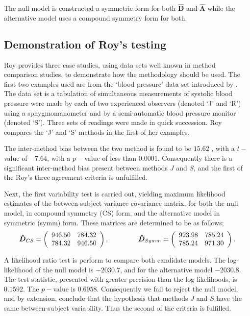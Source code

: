 The null model is constructed a symmetric form for both $\boldsymbol{\hat{D}}$ and $\boldsymbol{\hat{\Lambda}}$ while the alternative model uses a compound symmetry form for both.

\subsection{Demonstration of Roy's testing}
Roy provides three case studies, using data sets well known in method comparison studies, to demonstrate how the methodology should be used. The first two examples used are from the `blood pressure' data set introduced by \citet{BA99}. The data set is a tabulation of simultaneous measurements of systolic blood pressure were made by each of two experienced observers (denoted `J' and `R') using a sphygmomanometer and by a semi-automatic blood pressure monitor (denoted `S'). Three sets of readings were made in quick succession. Roy compares the `J' and `S' methods in the first of her examples.

The inter-method bias between the two method is found to be $15.62$ , with a $t-$value of $-7.64$, with a $p-$value of less than $0.0001$. Consequently there is a significant inter-method bias present between methods $J$ and $S$, and the first of the Roy's three agreement criteria is unfulfilled.

Next, the first variability test is carried out, yielding maximum likelihood estimates of the between-subject variance covariance matrix, for both the null model, in compound symmetry (CS) form, and the alternative model in symmetric (symm) form. These matrices are determined to be as follows;
\[
\boldsymbol{\hat{D}}_{CS} = \left( \begin{array}{cc}
    946.50 & 784.32  \\
    784.32 & 946.50  \\
    \end{array}\right),
\hspace{1.5cm}
    \boldsymbol{\hat{D}}_{Symm} = \left( \begin{array}{cc}
    923.98 & 785.24  \\
    785.24 & 971.30  \\
    \end{array}\right).
\]

A likelihood ratio test is perform to compare both candidate models. The log-likelihood of the null model is $-2030.7$, and for the alternative model $-2030.8$. The test statistic, presented with greater precision than the log-likelihoods, is $0.1592$. The $p-$value is $0.6958$. Consequently we fail to reject the null model, and by extension, conclude that the hypothesis that methods $J$ and $S$ have the same between-subject variability. Thus the second of the criteria is fulfilled.

